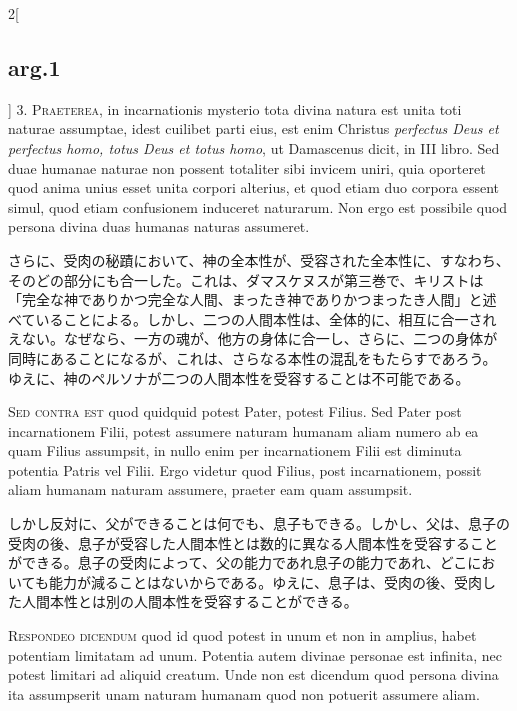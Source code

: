 \documentclass[paper=a4paper,fontsize=10pt,jafontsize=9pt,titlepage]{jlreq}
\begin{document}
\begin{paracol}{2}[\subsection{arg.1}]
3. {\scshape Praeterea}, in incarnationis mysterio tota divina natura est unita toti
naturae assumptae, idest cuilibet parti eius, est enim Christus
{\itshape perfectus Deus et perfectus homo, totus Deus et totus homo}, ut
Damascenus dicit, in III libro. Sed duae humanae naturae non possent
totaliter sibi invicem uniri, quia oporteret quod anima unius esset
unita corpori alterius, et quod etiam duo corpora essent simul, quod
etiam confusionem induceret naturarum. Non ergo est possibile quod
persona divina duas humanas naturas assumeret.

\switchcolumn

さらに、受肉の秘蹟において、神の全本性が、受容された全本性に、すなわち、
 そのどの部分にも合一した。これは、ダマスケヌスが第三巻で、キリストは
 「完全な神でありかつ完全な人間、まったき神でありかつまったき人間」と述
 べていることによる。しかし、二つの人間本性は、全体的に、相互に合一され
 えない。なぜなら、一方の魂が、他方の身体に合一し、さらに、二つの身体が
 同時にあることになるが、これは、さらなる本性の混乱をもたらすであろう。
 ゆえに、神のペルソナが二つの人間本性を受容することは不可能である。

\switchcolumn*[\subsection{s.c.}]

{\scshape Sed contra est} quod quidquid potest Pater, potest Filius. Sed Pater post
incarnationem Filii, potest assumere naturam humanam aliam numero ab ea
quam Filius assumpsit, in nullo enim per incarnationem Filii est
diminuta potentia Patris vel Filii. Ergo videtur quod Filius, post
incarnationem, possit aliam humanam naturam assumere, praeter eam quam
assumpsit.

\switchcolumn

しかし反対に、父ができることは何でも、息子もできる。しかし、父は、息子の
 受肉の後、息子が受容した人間本性とは数的に異なる人間本性を受容すること
 ができる。息子の受肉によって、父の能力であれ息子の能力であれ、どこにお
 いても能力が減ることはないからである。ゆえに、息子は、受肉の後、受肉し
 た人間本性とは別の人間本性を受容することができる。


{\scshape Respondeo dicendum} quod id quod potest in unum et non in amplius, habet
potentiam limitatam ad unum. Potentia autem divinae personae est
infinita, nec potest limitari ad aliquid creatum. Unde non est dicendum
quod persona divina ita assumpserit unam naturam humanam quod non
potuerit assumere aliam.


\end{paracol}
\end{document}
